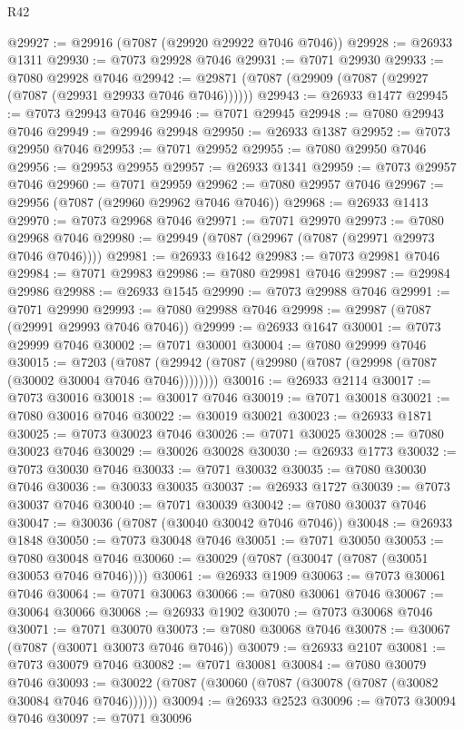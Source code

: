 \begin{lexlean}{R42}
\begin{coremodule}
{@29927 := @29916 (@7087 (@29920 @29922 @7046 @7046))
@29928 := @26933 @1311
@29930 := @7073 @29928 @7046
@29931 := @7071 @29930
@29933 := @7080 @29928 @7046
@29942 := @29871 (@7087 (@29909 (@7087 (@29927 (@7087 (@29931 @29933 @7046 @7046))))))
@29943 := @26933 @1477
@29945 := @7073 @29943 @7046
@29946 := @7071 @29945
@29948 := @7080 @29943 @7046
@29949 := @29946 @29948
@29950 := @26933 @1387
@29952 := @7073 @29950 @7046
@29953 := @7071 @29952
@29955 := @7080 @29950 @7046
@29956 := @29953 @29955
@29957 := @26933 @1341
@29959 := @7073 @29957 @7046
@29960 := @7071 @29959
@29962 := @7080 @29957 @7046
@29967 := @29956 (@7087 (@29960 @29962 @7046 @7046))
@29968 := @26933 @1413
@29970 := @7073 @29968 @7046
@29971 := @7071 @29970
@29973 := @7080 @29968 @7046
@29980 := @29949 (@7087 (@29967 (@7087 (@29971 @29973 @7046 @7046))))
@29981 := @26933 @1642
@29983 := @7073 @29981 @7046
@29984 := @7071 @29983
@29986 := @7080 @29981 @7046
@29987 := @29984 @29986
@29988 := @26933 @1545
@29990 := @7073 @29988 @7046
@29991 := @7071 @29990
@29993 := @7080 @29988 @7046
@29998 := @29987 (@7087 (@29991 @29993 @7046 @7046))
@29999 := @26933 @1647
@30001 := @7073 @29999 @7046
@30002 := @7071 @30001
@30004 := @7080 @29999 @7046
@30015 := @7203
    (@7087 (@29942 (@7087 (@29980 (@7087 (@29998 (@7087 (@30002 @30004 @7046 @7046))))))))
@30016 := @26933 @2114
@30017 := @7073 @30016
@30018 := @30017 @7046
@30019 := @7071 @30018
@30021 := @7080 @30016 @7046
@30022 := @30019 @30021
@30023 := @26933 @1871
@30025 := @7073 @30023 @7046
@30026 := @7071 @30025
@30028 := @7080 @30023 @7046
@30029 := @30026 @30028
@30030 := @26933 @1773
@30032 := @7073 @30030 @7046
@30033 := @7071 @30032
@30035 := @7080 @30030 @7046
@30036 := @30033 @30035
@30037 := @26933 @1727
@30039 := @7073 @30037 @7046
@30040 := @7071 @30039
@30042 := @7080 @30037 @7046
@30047 := @30036 (@7087 (@30040 @30042 @7046 @7046))
@30048 := @26933 @1848
@30050 := @7073 @30048 @7046
@30051 := @7071 @30050
@30053 := @7080 @30048 @7046
@30060 := @30029 (@7087 (@30047 (@7087 (@30051 @30053 @7046 @7046))))
@30061 := @26933 @1909
@30063 := @7073 @30061 @7046
@30064 := @7071 @30063
@30066 := @7080 @30061 @7046
@30067 := @30064 @30066
@30068 := @26933 @1902
@30070 := @7073 @30068 @7046
@30071 := @7071 @30070
@30073 := @7080 @30068 @7046
@30078 := @30067 (@7087 (@30071 @30073 @7046 @7046))
@30079 := @26933 @2107
@30081 := @7073 @30079 @7046
@30082 := @7071 @30081
@30084 := @7080 @30079 @7046
@30093 := @30022 (@7087 (@30060 (@7087 (@30078 (@7087 (@30082 @30084 @7046 @7046))))))
@30094 := @26933 @2523
@30096 := @7073 @30094 @7046
@30097 := @7071 @30096
}
\end{coremodule}
\end{lexlean}
